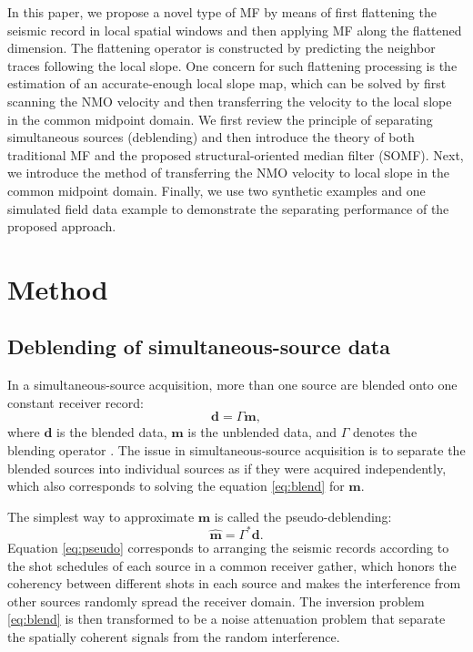 In this paper, we propose a novel type of MF  by means of first flattening the seismic record in local spatial windows and then applying MF along the flattened dimension. The flattening operator is constructed by predicting the neighbor traces following the local slope. One concern for such flattening processing is the estimation of an accurate-enough local slope map, which can be solved by first scanning the NMO velocity and then transferring the velocity to the local slope in the common midpoint domain. We first review the principle of separating simultaneous sources (deblending) and then introduce the theory of both traditional MF and the proposed structural-oriented median filter (SOMF). Next, we introduce the method of transferring the NMO velocity to local slope in the common midpoint domain. Finally, we use two synthetic examples and one simulated field data example to demonstrate the separating performance of the proposed approach.


\section{Method}
\subsection{Deblending of simultaneous-source data}
In a simultaneous-source acquisition, more than one source are blended onto one constant receiver record:
\begin{equation}
\label{eq:blend}
\mathbf{d}=\Gamma\mathbf{m},
\end{equation}
where $\mathbf{d}$ is the blended data, $\mathbf{m}$ is the unblended data, and $\Gamma$ denotes the blending operator \cite[]{sep,yangkang20142,yangkang2015pnmo}. The  issue in simultaneous-source acquisition is to separate the blended sources into individual sources as if they were acquired independently, which also corresponds to solving the equation \ref{eq:blend} for $\mathbf{m}$.

The simplest way to approximate $\mathbf{m}$ is called the pseudo-deblending:
\begin{equation}
\label{eq:pseudo}
\hat{\mathbf{m}} = \Gamma^*\mathbf{d}.
\end{equation}
Equation \ref{eq:pseudo} corresponds to arranging the seismic records according to the shot schedules of each source in a common receiver gather, which honors the coherency between different shots in each source and makes the interference from other sources randomly spread the receiver domain. The inversion problem  \ref{eq:blend} is then transformed to be a noise attenuation problem that separate the spatially coherent signals from the random interference.

